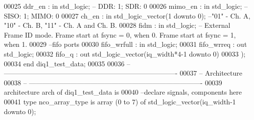 \begin{DoxyCode}
00025         \textcolor{vhdlchar}{ddr_en}      \textcolor{vhdlchar}{:} \textcolor{keywordflow}{in} \textcolor{comment}{std\_logic};\textcolor{keyword}{ -- DDR: 1; SDR: 0}
00026         \textcolor{vhdlchar}{mimo_en}     \textcolor{vhdlchar}{:} \textcolor{keywordflow}{in} \textcolor{comment}{std\_logic};\textcolor{keyword}{ -- SISO: 1; MIMO: 0}
00027         \textcolor{vhdlchar}{ch_en}           \textcolor{vhdlchar}{:} \textcolor{keywordflow}{in} \textcolor{comment}{std\_logic\_vector}\textcolor{vhdlchar}{(}\textcolor{vhdllogic}{}\textcolor{vhdllogic}{1} \textcolor{keywordflow}{downto} \textcolor{vhdllogic}{}\textcolor{vhdllogic}{0}\textcolor{vhdlchar}{)};\textcolor{keyword}{ --"01" - Ch. A, "10" - Ch. B, "11" - Ch. A and
       Ch. B.  }
00028         \textcolor{vhdlchar}{fidm}            \textcolor{vhdlchar}{:} \textcolor{keywordflow}{in} \textcolor{comment}{std\_logic};\textcolor{keyword}{ -- External Frame ID mode. Frame start at fsync = 0, when 0. Frame
       start at fsync = 1, when 1.}
00029 \textcolor{keyword}{      --fifo ports }
00030       \textcolor{vhdlchar}{fifo_wrfull} \textcolor{vhdlchar}{:} \textcolor{keywordflow}{in} \textcolor{comment}{std\_logic};
00031       \textcolor{vhdlchar}{fifo_wrreq}  \textcolor{vhdlchar}{:} \textcolor{keywordflow}{out} \textcolor{comment}{std\_logic};
00032       \textcolor{vhdlchar}{fifo_q}      \textcolor{vhdlchar}{:} \textcolor{keywordflow}{out} \textcolor{comment}{std\_logic\_vector}\textcolor{vhdlchar}{(}\textcolor{vhdlchar}{iq_width}\textcolor{vhdlchar}{*}\textcolor{vhdllogic}{4-1} \textcolor{keywordflow}{downto} \textcolor{vhdllogic}{}\textcolor{vhdllogic}{0}\textcolor{vhdlchar}{)}        
00033         \textcolor{vhdlchar}{)};
00034 \textcolor{keywordflow}{end} \textcolor{vhdlchar}{diq1\_test\_data};
00035 
00036 \textcolor{keyword}{-- ----------------------------------------------------------------------------}
00037 \textcolor{keyword}{-- Architecture}
00038 \textcolor{keyword}{-- ----------------------------------------------------------------------------}
00039 \textcolor{keywordflow}{architecture} arch \textcolor{keywordflow}{of} diq1_test_data is
00040 \textcolor{keyword}{--declare signals,  components here}
00041 \textcolor{keywordflow}{type} \textcolor{vhdlchar}{nco_array_type} \textcolor{keywordflow}{is} \textcolor{keywordflow}{array} \textcolor{vhdlchar}{(}\textcolor{vhdllogic}{}\textcolor{vhdllogic}{0} \textcolor{keywordflow}{to} \textcolor{vhdllogic}{}\textcolor{vhdllogic}{7}\textcolor{vhdlchar}{)} \textcolor{keywordflow}{of} \textcolor{comment}{std\_logic\_vector}\textcolor{vhdlchar}{(}\textcolor{vhdlchar}{iq_width}\textcolor{vhdlchar}{-}\textcolor{vhdllogic}{}\textcolor{vhdllogic}{1} \textcolor{keywordflow}{downto} \textcolor{vhdllogic}{}\textcolor{vhdllogic}{0}\textcolor{vhdlchar}{)};

\end{DoxyCode}
